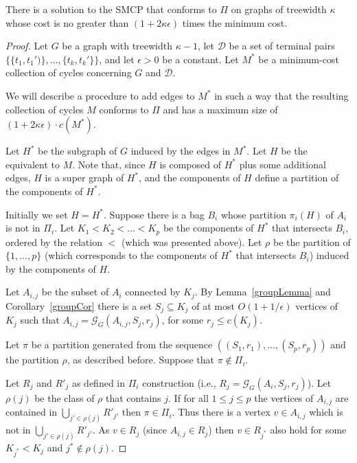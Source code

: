\begin{ftheo}\label{conformingPi}

There is a solution to the SMCP that conforms to \(\Pi\) on graphs of treewidth \(\kappa\) whose cost is no greater than \((1 + 2 \kappa \epsilon)\) times the minimum cost.

\end{ftheo}
\begin{proof}

Let \(G\) be a graph with treewidth \(\kappa - 1\), let \(\mathcal{D}\) be a set of terminal pairs \(\{\{t_1, t_1')\}, \dots, \{t_k, t_k'\}\}\), and  let \(\epsilon > 0\) be a constant.
Let \(M^\ast\) be a minimum-cost collection of cycles concerning \(G\) and \(\mathcal{D}\).

We will describe a procedure to add edges to \(M^\ast\) in such a way that the resulting collection of cycles \(M\) conforms to \(\Pi\) and has a maximum size of \((1 + 2\kappa \epsilon ) \cdot c(M^\ast)\).

Let \(H^\ast\) be the subgraph of \(G\) induced by the edges in \(M^\ast\). Let \(H\) be the equivalent to \(M\). Note that, since \(H\) is composed of \(H^\ast\) plus some additional edges, \(H\) is a super graph of \(H^\ast\), and the components of \(H\) define a partition of the components of \(H^\ast\).

Initially we set \(H = H^\ast\). Suppose there is a bag \(B_i\) whose partition \(\pi_i(H)\) of \(A_i\) is not in \(\Pi_i\). Let \(K_1 < K_2 < \dots < K_p\) be the components of \(H^\ast\) that intersects \(B_i\), ordered by the relation \(<\) (which was presented above). Let \(\rho\) be the partition of \(\{1, \dots, p\}\) (which corresponds to the components of \(H^\ast\) that intersects \(B_i\)) induced by the components of \(H\).

Let \(A_{i, j}\) be the subset of \(A_i\) connected by \(K_j\). By Lemma~\ref{groupLemma} and Corollary~\ref{groupCor} there is a set \(S_j \subseteq K_j\) of at most \(O(1 + 1/\epsilon)\) vertices of \(K_j\) such that \(A_{i,j} = \mathcal{G}_G(A_{i,j}, S_j, r_j)\), for some \(r_j \leq c(K_j)\).

Let \(\pi\) be a partition generated from the sequence \(((S_1, r_1), \dots, (S_p, r_p))\) and the partition \(\rho\), as described before. Suppose that \(\pi \notin \Pi_i\).

Let \(R_j\) and \(R'_j\) as defined in \(\Pi_i\) construction (i.e., \(R_j = \mathcal{G}_G(A_i, S_j, r_j)\)). Let \(\rho(j)\) be the class of \(\rho\) that contains \(j\). If for all \(1 \leq j \leq p\)  the vertices of \(A_{i,j}\) are contained in \(\bigcup_{j' \in \rho(j)}R'_{j'}\) then \(\pi \in \Pi_i\).
Thus there is a vertex \(v \in A_{i,j}\) which is not in \(\bigcup_{j' \in \rho(j)}R'_{j'}\). As \(v \in R_j\) (since \(A_{i,j} \in R_j\)) then \(v \in R_{j^\ast}\) also hold for some \(K_{j^\ast} < K_j\) and \(j^\ast \not\in \rho(j)\).


\end{proof}
